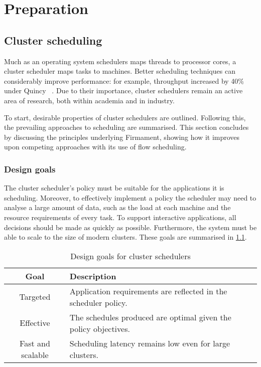 \chapter{Preparation} \label{chap:prep}

\section{Cluster scheduling} \label{sec:prep-scheduling}


Much as an operating system schedulers maps threads to processor cores, a cluster scheduler maps tasks to machines. Better scheduling techniques can considerably improve performance: for example, throughput increased by 40\% under Quincy ~\cite{Isard:2009}. Due to their importance, cluster schedulers remain an active area of research, both within academia and in industry.

To start, desirable properties of cluster schedulers are outlined. Following this, the prevailing approaches to scheduling are summarised. This section concludes by discussing the principles underlying Firmament, showing how it improves upon competing approaches with its use of flow scheduling.

\subsection{Design goals} \label{sec:prep-scheduling-goals}


The cluster scheduler's policy must be suitable for the applications it is scheduling. Moreover, to effectively implement a policy the scheduler may need to analyse a large amount of data, such as the load at each machine and the resource requirements of every task. To support interactive applications, all decisions should be made as quickly as possible. Furthermore, the system must be able to scale to the size of modern clusters. These goals are summarised in \cref{table:cluster-scheduler-design-goals}.

\begin{table}
    \begin{tabular}{c|l}
        \textbf{Goal} & \textbf{Description}\tabularnewline
        \hline
        Targeted & Application requirements are reflected in the scheduler policy. \tabularnewline
        Effective & The schedules produced are optimal given the policy objectives. \tabularnewline
        Fast and scalable & Scheduling latency remains low even for large clusters. \tabularnewline
        \hline
    \end{tabular}
    \caption{Design goals for cluster schedulers}
    \label{table:cluster-scheduler-design-goals}
\end{table}

